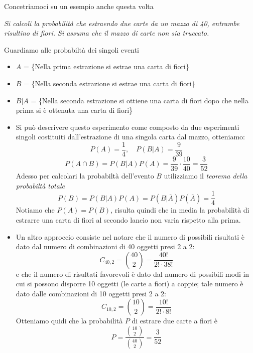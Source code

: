 \documentclass[11pt,a4paper]{article}
\begin{document}
Concetriamoci su un esempio anche questa volta
\begin{importantbox}
    \textit{Si calcoli la probabilità che estraendo due carte da un mazzo di 40, entrambe
    risultino di fiori. Si assuma che il mazzo di carte non sia truccato.}
\end{importantbox}
Guardiamo alle probabiltà dei singoli eventi 
\begin{itemize}
    \item $A$ = \{Nella prima estrazione si estrae una carta di fiori\}
    \item $B$ = \{Nella seconda estrazione si estrae una carta di fiori\}
    \item $B|A$ = \{Nella seconda estrazione si ottiene una carta di fiori dopo che nella prima
si è ottenuta una carta di fiori\}
\end{itemize}
\begin{itemize}
    \item  Si può descrivere questo esperimento come composto da due
esperimenti singoli costituiti dall’estrazione di una singola carta dal mazzo, otteniamo: 
    \[
        P(A) = \frac{1}{4}, \quad P(B|A) = \frac{9}{39}
    \]
    \[
        P(A \cap B) = P(B|A)P(A) =\frac{9}{39}\cdot\frac{10}{40} = \frac{3}{52}
    \]
    Adesso per calcolari la probabiltà dell'evento $B$ utilizziamo il \textit{teorema della probabiltà totale}
    \[
        P(B) = P(B|A)P(A) = P(B|\overline A)P(\overline A) = \frac{1}{4}
    \]
    Notiamo che $P(A) = P(B)$, risulta quindi che in media la probabilità di estrarre 
    una carta di fiori al secondo lancio non varia rispetto alla prima.
\item Un altro approccio consiste nel notare che il  numero di possibili risultati è dato dal numero di combinazioni di 40
oggetti presi 2 a 2:
\[
    C_{40,2} = \binom{40}{2} = \frac{40!}{2!\cdot38!}
\]
e che il numero di risultati favorevoli è dato dal numero di possibili modi in
cui si possono disporre 10 oggetti (le carte a fiori) a coppie; tale
numero è dato dalle combinazioni di 10 oggetti presi 2 a 2:
\[
    C_{10, 2} = \binom{10}{2} = \frac{10!}{2!\cdot8!}
\]
Otteniamo quidi che la probabilità $P$ di estrare due carte a fiori è
\[
    P = \frac{\binom{10}{2}}{\binom{40}{2}} = \frac{3}{52}
\]
\end{itemize}
\end{document}
